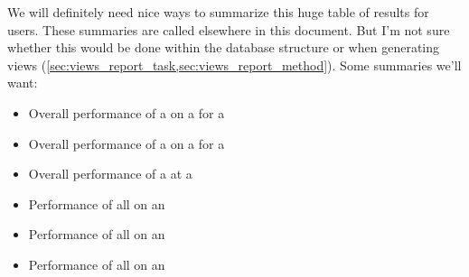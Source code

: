 We will definitely need nice ways to summarize this huge table of results for users.
These summaries are called \Reports elsewhere in this document.
But I'm not sure whether this would be done within the database structure or when generating views (\eg \cref{sec:views_report_task,sec:views_report_method}).
Some summaries we'll want:
\begin{itemize}
    \item Overall performance of a \Method on a \Refset for a \Task
    \item Overall performance of a \Method on a \Benchmark for a \Task
    \item Overall performance of a \Method at a \Task
    \item Performance of all \Methods on an \Element
    \item Performance of all \Methods on an \Refset
    \item Performance of all \Methods on an \Benchmark
\end{itemize}




% 
% 
% 
% 
% 
